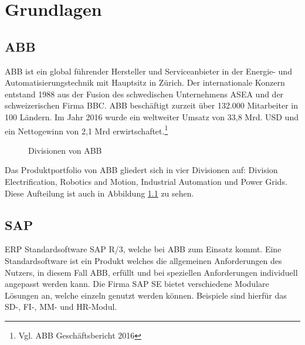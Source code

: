
\chapter{Grundlagen}


\section{ABB}

ABB ist ein global f\"{u}hrender Hersteller und Serviceanbieter in der Energie- und Automatisierungstechnik mit Hauptsitz in Z\"{u}rich.
Der internationale Konzern entstand 1988 aus der Fusion des schwedischen Unternehmens \ac{ASEA} und der schweizerischen Firma \ac{BBC}. ABB besch\"{a}ftigt zurzeit \"{u}ber 132.000 Mitarbeiter in 100 L\"{a}ndern. Im Jahr 2016 wurde ein weltweiter Umsatz von 33,8 Mrd. USD und ein Nettogewinn von 2,1 Mrd erwirtschaftet.\footnote{Vgl. ABB Gesch\"{a}ftsbericht 2016} 
\linebreak



\begin{figure}[ht]
	\centering
	
	\caption{Divisionen von ABB}
	\label{fig1}
	
\end{figure}

Das Produktportfolio von ABB gliedert sich in vier Divisionen auf: Division Electrification, Robotics and Motion, Industrial Automation und Power Grids. Diese Aufteilung ist auch in Abbildung \ref{fig1} zu sehen.


\section{SAP}



\ac{ERP} Standardsoftware SAP R/3, welche bei ABB zum Einsatz kommt. Eine Standardsoftware ist ein Produkt welches die allgemeinen Anforderungen des Nutzers, in diesem Fall ABB, erfüllt und bei speziellen Anforderungen individuell angepasst werden kann. Die Firma SAP SE bietet verschiedene Modulare Lösungen an, welche einzeln genutzt werden können. Beispiele sind hierfür das \ac{SD}-, \ac{FI}-, \ac{MM}- und \ac{HR}-Modul. \\ 

